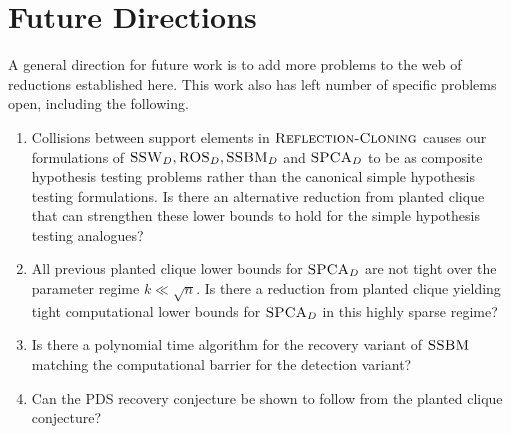 %
%

\section{Future Directions}
\label{s:future}

A general direction for future work is to add more problems to the web of reductions established here. This work also has left number of specific problems open, including the following.
\begin{enumerate}
\item Collisions between support elements in $\textsc{Reflection-Cloning}$ causes our formulations of $\textsc{SSW}_D, \textsc{ROS}_D, \textsc{SSBM}_D$ and $\textsc{SPCA}_D$ to be as composite hypothesis testing problems rather than the canonical simple hypothesis testing formulations. Is there an alternative reduction from planted clique that can strengthen these lower bounds to hold for the simple hypothesis testing analogues?
\item All previous planted clique lower bounds for $\textsc{SPCA}_D$ are not tight over the parameter regime $k \ll \sqrt{n}$. Is there a reduction from planted clique yielding tight computational lower bounds for $\textsc{SPCA}_D$ in this highly sparse regime?
\item Is there a polynomial time algorithm for the recovery variant of $\textsc{SSBM}$ matching the computational barrier for the detection variant?
\item Can the PDS recovery conjecture be shown to follow from the planted clique conjecture?
\end{enumerate}